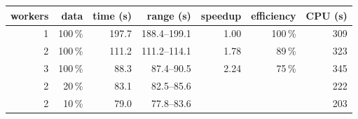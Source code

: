\documentclass[sigconf]{acmart}
\begin{document}
\par\medskip\noindent\begin{minipage}{\columnwidth}
\centering\footnotesize\setlength{\tabcolsep}{4pt}
\label{tab:linux-scaling}
\begin{tabular}{rrrrrrr}
\toprule
workers & data & time (s) & range (s) & speedup & efficiency & CPU (s) \\
\midrule
1 & 100\,\% & 197.7 & 188.4--199.1 & 1.00 & 100\,\% & 309 \\
2 & 100\,\% & 111.2 & 111.2--114.1 & 1.78 & 89\,\% & 323 \\
3 & 100\,\% & 88.3 & 87.4--90.5 & 2.24 & 75\,\% & 345 \\
2 & 20\,\% & 83.1 & 82.5--85.6 &  &  & 222 \\
2 & 10\,\% & 79.0 & 77.8--83.6 &  &  & 203 \\
\bottomrule
\end{tabular}
\end{minipage}
\end{document}
